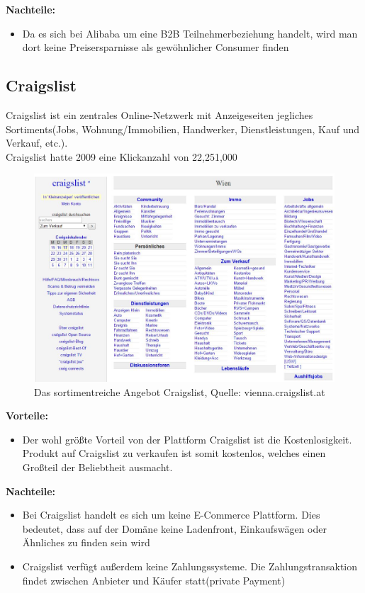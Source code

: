 \documentclass[11pt,a4paper]{article}
\begin{document}
 
\noindent \textbf{Nachteile:}

\begin{itemize}
	\item Da es sich bei Alibaba um eine B2B Teilnehmerbeziehung handelt, wird man dort keine Preisersparnisse als gewöhnlicher Consumer finden
\end{itemize}

\newpage
\subsection{Craigslist}
Craigslist ist ein zentrales Online-Netzwerk mit Anzeigeseiten jegliches Sortiments(Jobs, Wohnung/Immobilien, Handwerker, Dienstleistungen, Kauf und Verkauf, etc.). \\ Craigslist hatte 2009 eine Klickanzahl von 22,251,000

\begin{figure}[ht!]
	\centering
	\includegraphics[width=180mm]{craigslist}
	\caption{Das sortimentreiche Angebot Craigslist, Quelle: vienna.craigslist.at \label{craigslist}}
\end{figure}

\noindent \textbf{Vorteile:}

\begin{itemize}
	\item Der wohl größte Vorteil von der Plattform Craigslist ist die Kostenlosigkeit. Produkt auf Craigslist zu verkaufen ist somit kostenlos, welches einen Großteil der Beliebtheit ausmacht.
\end{itemize}

\noindent \textbf{Nachteile:}

\begin{itemize}
	\item Bei Craigslist handelt es sich um keine E-Commerce Plattform. Dies bedeutet, dass auf der Domäne keine Ladenfront, Einkaufswägen oder Ähnliches zu finden sein wird
	\item Craigslist verfügt außerdem keine Zahlungssysteme. Die Zahlungstransaktion findet zwischen Anbieter und Käufer statt(private Payment)
\end{itemize}
\end{document}
